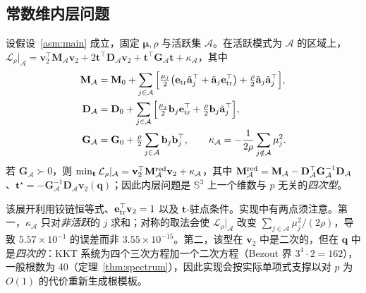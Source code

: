 \subsection{常数维内层问题}\label{sec:dim}
\begin{theorem}[常维约简]\label{thm:dim}
设假设~\ref{asm:main} 成立，固定 $\boldsymbol\mu,\rho$ 与活跃集 $\mathcal A$。在活跃模式为 $\mathcal A$ 的区域上，$\mathcal L_\rho|_{\mathcal A}=\mathbf v_2^\top\mathbf M_{\mathcal A}\mathbf v_2+2\mathbf t^\top\mathbf D_{\mathcal A}\mathbf v_2+\mathbf t^\top\mathbf G_{\mathcal A}\mathbf t+\kappa_{\mathcal A}$，其中
\begin{equation}
\begin{aligned}
\mathbf M_{\mathcal A}&=\mathbf M_0+\sum_{j\in\mathcal A}\Big[\tfrac{\mu_j}{2}\big(\mathbf e_{\rm tr}\tilde{\mathbf a}_j^\top+\tilde{\mathbf a}_j\mathbf e_{\rm tr}^\top\big)+\tfrac{\rho}{2}\tilde{\mathbf a}_j\tilde{\mathbf a}_j^\top\Big],\\
\mathbf D_{\mathcal A}&=\mathbf D_0+\sum_{j\in\mathcal A}\Big[\tfrac{\mu_j}{2}\mathbf b_j\mathbf e_{\rm tr}^\top+\tfrac{\rho}{2}\mathbf b_j\tilde{\mathbf a}_j^\top\Big],\\
\mathbf G_{\mathcal A}&=\mathbf G_0+\tfrac{\rho}{2}\sum_{j\in\mathcal A}\mathbf b_j\mathbf b_j^\top,\qquad
\kappa_{\mathcal A}=-\frac{1}{2\rho}\sum_{j\notin\mathcal A}\mu_j^2 .
\end{aligned}
\label{eq:MA}
\end{equation}
若 $\mathbf G_{\mathcal A}\succ0$，则 $\min_{\mathbf t}\mathcal L_\rho|_{\mathcal A}=\mathbf v_2^\top\mathbf M^{\rm red}_{\mathcal A}\mathbf v_2+\kappa_{\mathcal A}$，其中 $\mathbf M^{\rm red}_{\mathcal A}=\mathbf M_{\mathcal A}-\mathbf D_{\mathcal A}^\top\mathbf G_{\mathcal A}^{-1}\mathbf D_{\mathcal A}$、$\mathbf t^\star=-\mathbf G_{\mathcal A}^{-1}\mathbf D_{\mathcal A}\mathbf v_2(\mathbf q)$；因此内层问题是 $\mathbb{S}^3$ 上一个维数与 $p$ 无关的\emph{四次型}。
\end{theorem}
该展开利用铰链恒等式、$\mathbf e_{\rm tr}^\top\mathbf v_2=1$ 以及 $\mathbf t$-驻点条件。实现中有两点须注意。第一，$\kappa_{\mathcal A}$ 只对\emph{非活跃}的 $j$ 求和；对称的取法会使 $\mathcal L_\rho|_{\mathcal A}$ 改变 $\sum_{j\in\mathcal A}\mu_j^2/(2\rho)$，导致 $5.57\times10^{-1}$ 的误差而非 $3.55\times10^{-15}$。第二，该型在 $\mathbf v_2$ 中是二次的，但在 $\mathbf q$ 中是\emph{四次的}：KKT 系统为四个三次方程加一个二次方程（Bezout 界 $3^4\cdot2=162$），一般根数为 40（定理~\ref{thm:spectrum}），因此实现会按实际单项式支撑以对 $p$ 为 $O(1)$ 的代价重新生成根模板。

